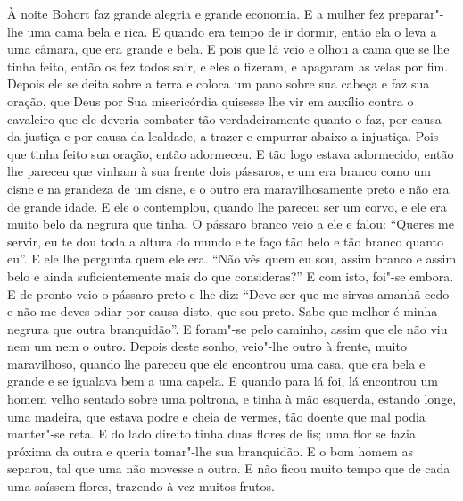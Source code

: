À noite Bohort faz grande alegria e grande economia. E a mulher fez preparar"-lhe
uma cama bela e rica. E quando era tempo de ir dormir, então ela o leva a uma
câmara, que era grande e bela. E pois que lá veio e olhou a cama que se lhe
tinha feito, então os fez todos sair, e eles o fizeram, e apagaram as velas por
fim. Depois ele se deita sobre a terra e coloca um pano sobre sua cabeça e faz
sua oração, que Deus por Sua misericórdia quisesse lhe vir em auxílio contra o
cavaleiro que ele deveria combater tão verdadeiramente quanto o faz, por causa
da justiça e por causa da lealdade, a trazer e empurrar abaixo a injustiça.
Pois que tinha feito sua oração, então adormeceu. E tão logo estava adormecido,
então lhe pareceu que vinham à sua frente dois pássaros, e um era branco como
um cisne e na grandeza de um cisne, e o outro era maravilhosamente preto e não
era de grande idade. E ele o contemplou, quando lhe pareceu ser um corvo, e ele
era muito belo da negrura que tinha. O pássaro branco veio a ele e falou:
``Queres me servir, eu te dou toda a altura do mundo e te faço tão belo e tão
branco quanto eu”. E ele lhe pergunta quem ele era. “Não vês quem eu sou, assim
branco e assim belo e ainda suficientemente mais do que consideras?” E com
isto, foi"-se embora. E de pronto veio o pássaro preto e lhe diz: “Deve ser que
me sirvas amanhã cedo e não me deves odiar por causa disto, que sou preto. Sabe
que melhor é minha negrura que outra branquidão”. E foram"-se pelo caminho,
assim que ele não viu nem um nem o outro. Depois deste sonho, veio"-lhe outro à
frente, muito maravilhoso, quando lhe pareceu que ele encontrou uma casa, que
era bela e grande e se igualava bem a uma capela. E quando para lá foi, lá
encontrou um homem velho sentado sobre uma poltrona, e tinha à mão esquerda, 
estando longe, uma madeira, que estava podre e cheia de vermes, tão doente que
mal podia manter"-se reta. E do lado direito tinha duas flores de lis; uma flor
se fazia próxima da outra e queria tomar"-lhe sua branquidão. E o bom homem as
separou, tal que uma não movesse a outra. E não ficou muito tempo que de cada
uma saíssem flores, trazendo à vez muitos frutos.

